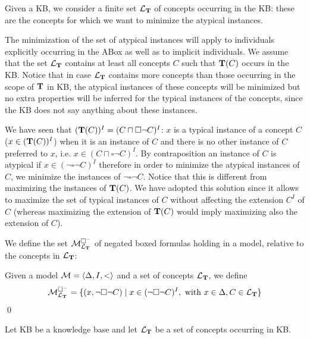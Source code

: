 \documentclass[a4paper, 11pt, oneside]{duthesis}
\newcommand{\tip}{{\bf T}}
\newcommand{\nott} {\lnot}
\newcommand{\tc} {\mid}
\newcommand{\bbox}{\square}
\newcommand{\sx} {\langle}
\newcommand{\dx} {\rangle}
\newcommand{\ellet} {\mathcal{L}_{\bf T}}
\newcommand{\emme} {\begin{mathcal}M\end{mathcal}}
\newenvironment{definition}
{\begin{defi} \rm}{\qed \end{defi}}
\newenvironment{definition}
{\begin{defi} \rm}{\qed \end{defi}}
\newtheorem{definition}{Definition}
\newcounter{posu}
\newtheorem{definition}[posu]{Definition}
\begin{document}
Given a KB, we consider a finite set $\ellet$ of concepts occurring in the KB: these are the concepts for which we want to minimize the atypical instances.

The minimization of the set of atypical instances will apply to individuals explicitly occurring in the ABox as well as to implicit individuals.
We assume that the set $\ellet$ contains at least all concepts $C$ such that $\tip(C)$ occurs in the KB.
Notice that in case $\ellet$ contains more concepts than those occurring in the scope of $\tip$ in KB, the atypical instances of these concepts will be minimized but no extra properties will be inferred for the typical instances of the concepts, since the KB does not say anything about these instances.

We have seen that $(\tip(C))^I =(C \sqcap \bbox \neg C)^I$: $x$ is a typical instance  of a concept $C$ ($x \in (\tip(C))^I$) when it is an instance of $C$  and there is no other instance of $C$ preferred to $x$, i.e. $x \in (C \sqcap \bbox \neg C)^I$.
By contraposition an instance of $C$ is atypical if $x \in (\neg \bbox \neg C)^I$ therefore in order to minimize the atypical instances of $C$, we minimize the instances of $\neg \bbox \neg C$.
Notice that this is different from maximizing the instances of $\tip(C)$.
We have adopted this solution since it allows to maximize the set of typical instances of $C$ without affecting the extension $C^I$ of $C$ (whereas maximizing the extension of $\tip(C)$  would imply maximizing also the extension of $C$).

We define the set $\emme^{\bbox^-}_{\ellet}$ of negated boxed formulas holding in a model, relative to the concepts in $\ellet$:

\begin{definition}
Given a model $\emme=\sx \Delta, I, <\dx$ and a set of concepts $\ellet$, we define $$\emme^{\bbox^-}_{\ellet}=\{(x, \nott \bbox \nott C) \tc x \in (\nott \bbox \nott C)^I, \ \mbox{with} \ x \in \Delta, C \in \ellet \}$$
\end{definition}


\noindent Let KB be a knowledge base and let ${\ellet}$ be a set of concepts occurring in KB.
\end{document}
